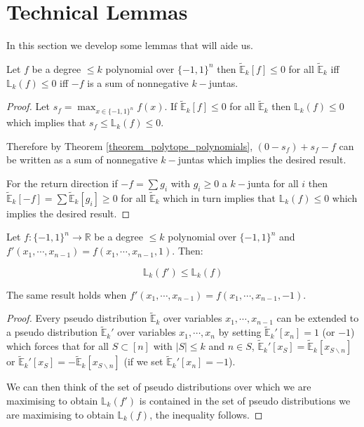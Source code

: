 \section{Technical Lemmas}
In this section we develop some lemmas that will aide us.
\begin{lemma}\label{equivalence_lk_juntas}
Let $f$ be a degree $\leq k$ polynomial over $\{-1,1\}^n$ then $\tilde{\mathbb{E}}_k[f] \leq 0$ for all $\tilde{\mathbb{E}}_k$ iff  $\mathbb{L}_k(f) \leq 0$ iff $-f$ is a sum of nonnegative $k-$juntas.
\end{lemma}

\begin{proof}
Let $s_f = \max_{x \in \{-1,1\}^n} f(x)$. If $\tilde{\mathbb{E}}_k [f] \leq 0$ for all $\tilde{\mathbb{E}}_k$ then $\mathbb{L}_k(f) \leq 0$ which implies that $s_f \leq \mathbb{L}_k(f) \leq 0$.

Therefore by Theorem \ref{theorem_polytope_polynomials}, $(0-s_f) + s_f -f$ can be written as a sum of nonnegative $k-$juntas which implies the desired result.

For the return direction if $-f = \sum g_i$ with $g_i \geq 0$ a $k-$junta for all $i$ then $\tilde{\mathbb{E}}_k[-f] = \sum \tilde{\mathbb{E}}_k[g_i] \geq 0$ for all $\tilde{\mathbb{E}}_k$ which in turn implies that $\mathbb{L}_k(f) \leq 0$ which implies the desired result.

\end{proof}

\begin{lemma}

Let $f : \{-1,1\}^n \rightarrow \mathbb{R}$ be a degree $\leq k$ polynomial over $\{-1,1\}^n$ and $f'(x_1, \cdots, x_{n-1}) = f(x_1, \cdots, x_{n-1}, 1)$. Then:

\begin{equation}
\mathbb{L}_k(f') \leq \mathbb{L}_k(f)
\end{equation}

The same result holds when $f'(x_1, \cdots, x_{n-1}) = f(x_1, \cdots, x_{n-1}, -1)$.
\end{lemma}


\begin{proof}
Every pseudo distribution $\tilde{\mathbb{E}}_k$ over variables $x_1, \cdots, x_{n-1}$ can be extended to a pseudo distribution $\tilde{\mathbb{E}}_k'$ over variables $x_1, \cdots, x_n$ by setting $\tilde{\mathbb{E}}_k'[x_n] = 1$ (or $-1$) which forces that for all $S \subset [n]$ with $|S| \leq k$ and $n\in S$, $\tilde{\mathbb{E}}_k'[x_S] = \tilde{\mathbb{E}}_k[x_{S \backslash n}]$ or $\tilde{\mathbb{E}}_k'[x_S] = -\tilde{\mathbb{E}}_k[x_{S \backslash n}]$ (if we set $\tilde{\mathbb{E}}_k'[x_n] = -1$).

We can then think of the set of pseudo distributions over which we are maximising to obtain $\mathbb{L}_k(f')$ is contained in the set of pseudo distributions we are maximising to obtain $\mathbb{L}_k(f)$, the inequality follows.

\end{proof}


